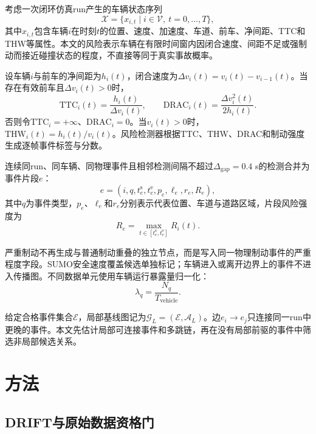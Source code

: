 \documentclass[journal]{IEEEtran}
\begin{document}
考虑一次闭环仿真run产生的车辆状态序列
\begin{equation}
\mathcal{X}=\{x_{i,t}\mid i\in\mathcal{V},\ t=0,\ldots,T\},
\end{equation}
其中$x_{i,t}$包含车辆$i$在时刻$t$的位置、速度、加速度、车道、前车、净间距、TTC和THW等属性。本文的风险表示车辆在有限时间窗内因闭合速度、间距不足或强制动而接近碰撞状态的程度，不直接等同于真实事故概率。

设车辆$i$与前车的净间距为$h_i(t)$，闭合速度为$\Delta v_i(t)=v_i(t)-v_{i-1}(t)$。当存在有效前车且$\Delta v_i(t)>0$时，
\begin{equation}
\mathrm{TTC}_i(t)=\frac{h_i(t)}{\Delta v_i(t)},\qquad
\mathrm{DRAC}_i(t)=\frac{\Delta v_i^2(t)}{2h_i(t)}.
\label{eq:ttc_drac}
\end{equation}
否则令$\mathrm{TTC}_i=+\infty$、$\mathrm{DRAC}_i=0$。当$v_i(t)>0$时，$\mathrm{THW}_i(t)=h_i(t)/v_i(t)$。风险检测器根据TTC、THW、DRAC和制动强度生成逐帧事件标签与分数。

连续同run、同车辆、同物理事件且相邻检测间隔不超过$\Delta_{\mathrm{gap}}=0.4$ s的检测合并为事件片段$e$：
\begin{equation}
e=(i,q,t_e^{\mathrm{s}},t_e^{\mathrm{e}},p_e,\ell_e,r_e,R_e),
\end{equation}
其中$q$为事件类型，$p_e$、$\ell_e$和$r_e$分别表示代表位置、车道与道路区域，片段风险强度为
\begin{equation}
R_e=\max_{t\in[t_e^{\mathrm{s}},t_e^{\mathrm{e}}]}R_i(t).
\end{equation}

严重制动不再生成与普通制动重叠的独立节点，而是写入同一物理制动事件的严重程度字段。SUMO安全速度覆盖候选单独标记；车辆进入或离开边界上的事件不进入传播图。不同数据单元使用车辆运行暴露量归一化：
\begin{equation}
\lambda_q=\frac{N_q}{T_{\mathrm{vehicle}}}.
\label{eq:event_rate}
\end{equation}

给定合格事件集合$\mathcal{E}$，局部基线图记为$\mathcal{G}_{L}=(\mathcal{E},\mathcal{A}_{L})$。边$e_i\rightarrow e_j$只连接同一run中更晚的事件。本文先估计局部可连接事件和多跳链，再在没有局部前驱的事件中筛选非局部候选关系。

\section{方法}\label{sec:method}

\subsection{DRIFT与原始数据资格门}
\end{document}
